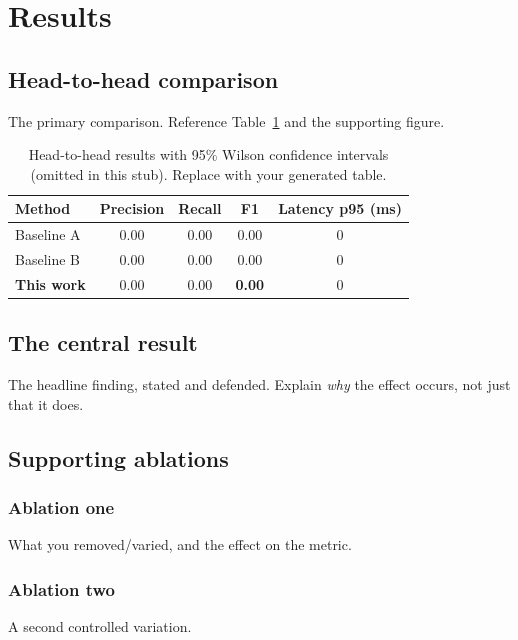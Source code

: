 \documentclass[11pt]{article}
\begin{document}
\section{Results}\label{sec:results}
\subsection{Head-to-head comparison}
The primary comparison. Reference Table~\ref{tab:main} and the supporting figure.

\begin{table}[htb]\centering\small
\begin{tabular}{lcccc}
\toprule
Method & Precision & Recall & F1 & Latency p95 (ms) \\
\midrule
Baseline A & 0.00 & 0.00 & 0.00 & 0 \\
Baseline B & 0.00 & 0.00 & 0.00 & 0 \\
\textbf{This work} & 0.00 & 0.00 & \textbf{0.00} & 0 \\
\bottomrule
\end{tabular}
\caption{Head-to-head results with 95\% Wilson confidence intervals (omitted in this
stub). Replace with your generated table.}
\label{tab:main}
\end{table}

\subsection{The central result}\label{sec:central-result}
The headline finding, stated and defended. Explain \emph{why} the effect occurs, not
just that it does.

\subsection{Supporting ablations}
\subsubsection{Ablation one}\label{sec:abl1}
What you removed/varied, and the effect on the metric.

\subsubsection{Ablation two}\label{sec:abl2}
A second controlled variation.
\end{document}
